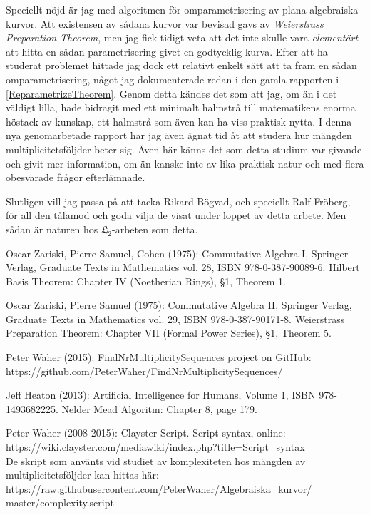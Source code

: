 \documentclass[twoside]{report}
\begin{document}
Speciellt nöjd är jag med algoritmen för omparametrisering av plana algebraiska kurvor. Att existensen av sådana kurvor var bevisad gavs av \emph{Weierstrass Preparation Theorem}, men jag fick tidigt veta att det inte skulle vara \emph{elementärt} att hitta en sådan parametrisering givet en godtycklig kurva. Efter att ha studerat problemet hittade jag dock ett relativt enkelt sätt att ta fram en sådan omparametrisering, något jag dokumenterade redan i den gamla rapporten i \ref{ReparametrizeTheorem}. Genom detta kändes det som att jag, om än i det väldigt lilla, hade bidragit med ett minimalt halmstrå till matematikens enorma höstack av kunskap, ett halmstrå som även kan ha viss praktisk nytta. I denna nya genomarbetade rapport har jag även ägnat tid åt att studera hur mängden multiplicitetsföljder beter sig. Även här känns det som detta studium var givande och givit mer information, om än kanske inte av lika praktisk natur och med flera obesvarade frågor efterlämnade.

Slutligen vill jag passa på att tacka Rikard Bögvad, och speciellt Ralf Fröberg, för all den tålamod och goda vilja de visat under loppet av detta arbete. Men sådan är naturen hos $\mathfrak{L}_2$-arbeten som detta.


\tableofcontents{}







\appendix{}






\begin{thebibliography}{99}
 Oscar Zariski, Pierre Samuel, Cohen (1975): Commutative Algebra I, Springer Verlag, Graduate Texts in Mathematics vol. 28, ISBN 978-0-387-90089-6. Hilbert Basis Theorem: Chapter IV (Noetherian Rings), §1, Theorem 1.

 Oscar Zariski, Pierre Samuel (1975): Commutative Algebra II, Springer Verlag, Graduate Texts in Mathematics vol. 29, ISBN 978-0-387-90171-8. Weierstrass Preparation Theorem: Chapter VII (Formal Power Series), §1, Theorem 5.

 Peter Waher (2015): FindNrMultiplicitySequences project on GitHub: https://github.com/PeterWaher/FindNrMultiplicitySequences/

 Jeff Heaton (2013): Artificial Intelligence for Humans, Volume 1, ISBN 978-1493682225. Nelder Mead Algoritm: Chapter 8, page 179.

 Peter Waher (2008-2015): Clayster Script. Script syntax, online: https://wiki.clayster.com/mediawiki/index.php?title=Script\_syntax\\
De skript som använts vid studiet av komplexiteten hos mängden av multiplicitetsföljder kan hittas här:\\
https://raw.githubusercontent.com/PeterWaher/Algebraiska\_kurvor/\\
master/complexity.script

\end{thebibliography}
\end{document}
